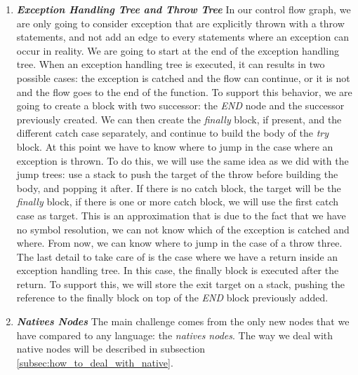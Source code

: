 \begin{enumerate}
	\item \textbf{\textit{Exception Handling Tree and Throw Tree}} \newline 
	\label{subsubsec:exception_handling_cfg}
	In our control flow graph, we are only going to consider exception that are explicitly thrown with a throw statements, and not add an edge to every statements where an exception can occur in reality. \newline
	We are going to start at the end of the exception handling tree. 
	When an exception handling tree is executed, it can results in two possible cases: the exception is catched and the flow can continue, or it is not and the flow goes to the end of the function. 
	To support this behavior, we are going to create a block with two successor: the \emph{END} node and the successor previously created. \newline
	We can then create the \emph{finally} block, if present, and the different catch case separately, and continue to build the body of the \emph{try} block. 
	At this point we have to know where to jump in the case where an exception is thrown. 
	To do this, we will use the same idea as we did with the jump trees: use a stack to push the target of the throw before building the body, and popping it after. 
	If there is no catch block, the target will be the \emph{finally} block, if there is one or more catch block, we will use the first catch case as target. 
	This is an approximation that is due to the fact that we have no symbol resolution, we can not know which of the exception is catched and where.
	From now, we can know where to jump in the case of a throw three.\newline
	The last detail to take care of is the case where we have a return inside an exception handling tree.
	In this case, the finally block is executed after the return. 
	To support this, we will store the exit target on a stack, pushing the reference to the finally block on top of the \emph{END} block previously added.
	
	\item \textbf{\textit{Natives Nodes}} \newline 
	\label{subsubsec:native_nodes_cfg}
	The main challenge comes from the only new nodes that we have compared to any language: the \emph{natives nodes}. 
	The way we deal with native nodes will be described in subsection \ref{subsec:how_to_deal_with_native}.
\end{enumerate}

